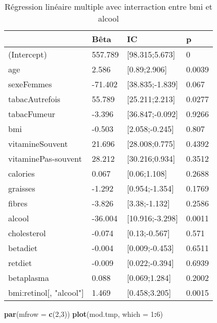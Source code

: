\documentclass[]{article}
\newenvironment{Shaded}{\begin{snugshade}}{\end{snugshade}}
\newcommand{\KeywordTok}[1]{\textcolor[rgb]{0.13,0.29,0.53}{\textbf{#1}}}
\newcommand{\DataTypeTok}[1]{\textcolor[rgb]{0.13,0.29,0.53}{#1}}
\newcommand{\DecValTok}[1]{\textcolor[rgb]{0.00,0.00,0.81}{#1}}
\newcommand{\OperatorTok}[1]{\textcolor[rgb]{0.81,0.36,0.00}{\textbf{#1}}}
\newcommand{\NormalTok}[1]{#1}
\begin{document}
\begin{table}

\caption{\label{tab:unnamed-chunk-72}Régression linéaire multiple avec interraction entre bmi et alcool}
\centering
\begin{tabular}[t]{l|l|l|l}
\hline
  & Bêta & IC & p\\
\hline
\rowcolor[HTML]{BBD2E1}  (Intercept) & 557.789 & [98.315;5.673] & 0\\
\hline
age & 2.586 & [0.89;2.906] & 0.0039\\
\hline
\rowcolor[HTML]{BBD2E1}  sexeFemmes & -71.402 & [38.835;-1.839] & 0.067\\
\hline
tabacAutrefois & 55.789 & [25.211;2.213] & 0.0277\\
\hline
\rowcolor[HTML]{BBD2E1}  tabacFumeur & -3.396 & [36.847;-0.092] & 0.9266\\
\hline
bmi & -0.503 & [2.058;-0.245] & 0.807\\
\hline
\rowcolor[HTML]{BBD2E1}  vitamineSouvent & 21.696 & [28.008;0.775] & 0.4392\\
\hline
vitaminePas-souvent & 28.212 & [30.216;0.934] & 0.3512\\
\hline
\rowcolor[HTML]{BBD2E1}  calories & 0.067 & [0.06;1.108] & 0.2688\\
\hline
graisses & -1.292 & [0.954;-1.354] & 0.1769\\
\hline
\rowcolor[HTML]{BBD2E1}  fibres & -3.826 & [3.38;-1.132] & 0.2586\\
\hline
alcool & -36.004 & [10.916;-3.298] & 0.0011\\
\hline
\rowcolor[HTML]{BBD2E1}  cholesterol & -0.074 & [0.13;-0.567] & 0.571\\
\hline
betadiet & -0.004 & [0.009;-0.453] & 0.6511\\
\hline
\rowcolor[HTML]{BBD2E1}  retdiet & -0.009 & [0.022;-0.394] & 0.6939\\
\hline
betaplasma & 0.088 & [0.069;1.284] & 0.2002\\
\hline
\rowcolor[HTML]{BBD2E1}  bmi:retinol[, "alcool"] & 1.469 & [0.458;3.205] & 0.0015\\
\hline
\end{tabular}
\end{table}

\begin{Shaded}
\begin{Highlighting}[]
\KeywordTok{par}\NormalTok{(}\DataTypeTok{mfrow =} \KeywordTok{c}\NormalTok{(}\DecValTok{2}\NormalTok{,}\DecValTok{3}\NormalTok{))}
\KeywordTok{plot}\NormalTok{(mod.tmp, }\DataTypeTok{which =} \DecValTok{1}\OperatorTok{:}\DecValTok{6}\NormalTok{)}
\end{Highlighting}
\end{Shaded}
\end{document}
